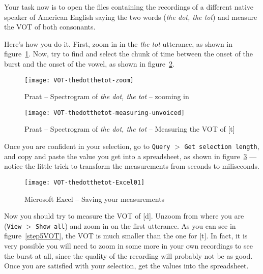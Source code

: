 \documentclass{article}
\newcommand{\soft}[1]{\textsf{#1}}
\newcommand{\softmenu}[1]{\texttt{#1}}
\newcommand{\MSExcel}{\soft{Microsoft\texttrademark{} Excel}}
\newcommand{\Praat}{\soft{Praat}}
\begin{document}
Your task now is to open the files containing the recordings of a different native speaker of American English saying the two words (\emph{the dot, the tot}) and measure the VOT of both consonants.

Here's how you do it. First, zoom in in the \emph{the tot} utterance, as shown in figure~\ref{step2VOT}. Now, try to find and select the chunk of time between the onset of the burst and the onset of the vowel, as shown in figure~\ref{step3VOT}. 
\begin{figure}[!tbp]
\caption{\Praat{} -- Spectrogram of \emph{the dot, the tot} -- zooming in}
\label{step2VOT}
	\begin{center}
		\texttt{[image: VOT-thedotthetot-zoom]}
	\end{center}
\end{figure}

\begin{figure}[!tbp]
\caption{\Praat{} -- Spectrogram of \emph{the dot, the tot} -- Measuring the VOT of [t]}
\label{step3VOT}
	\begin{center}
		\texttt{[image: VOT-thedotthetot-measuring-unvoiced]}
	\end{center}
\end{figure}

Once you are confident in your selection, go to \softmenu{Query} $>$ \softmenu{Get selection length}, and copy and paste the value you get into a spreadsheet, as shown in figure~\ref{step4VOT} --- notice the little trick to transform the measurements from seconds to miliseconds.

\begin{figure}[!tbp]
\caption{\MSExcel{} -- Saving your measurements}
\label{step4VOT}
	\begin{center}
		\texttt{[image: VOT-thedotthetot-Excel01]}
	\end{center}
\end{figure}

Now you should try to measure the VOT of [d]. Unzoom from where you are (\softmenu{View} $>$ \softmenu{Show all}) and zoom in on the first utterance. As you can see in figure~\ref{step5VOT}, the VOT is much smaller than the one for [t]. In fact, it is very possible you will need to zoom in some more in your own recordings to see the burst at all, since the quality of the recording will probably not be as good. Once you are satisfied with your selection, get the values into the spreadsheet.
\end{document}
